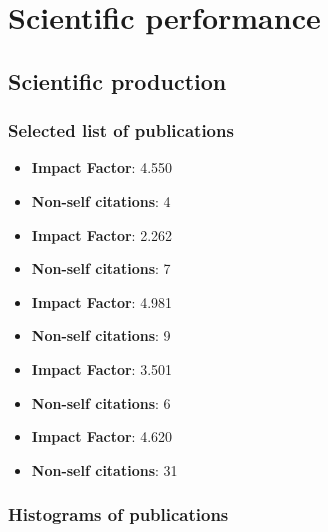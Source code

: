 \section{Scientific performance} \label{sec:sci-performance}

\subsection{Scientific production}

\subsubsection{Selected list of publications}

\autocite{Lamurias2015} 
\begin{itemize}
    \item \textbf{Impact Factor}: 4.550
    \item \textbf{Non-self citations}: 4
\end{itemize}

\autocite{Pesquita2014} 
\begin{itemize}
    \item \textbf{Impact Factor}: 2.262
    \item \textbf{Non-self citations}: 7
\end{itemize}

\autocite{Ferreira2013} 
\begin{itemize}
    \item \textbf{Impact Factor}: 4.981
    \item \textbf{Non-self citations}: 9
\end{itemize}

\autocite{Ferreira2012a} 
\begin{itemize}
    \item \textbf{Impact Factor}: 3.501
    \item \textbf{Non-self citations}: 6
\end{itemize}

\autocite{Ferreira2010} 
\begin{itemize}
    \item \textbf{Impact Factor}: 4.620
    \item \textbf{Non-self citations}: 31
\end{itemize}


\subsubsection{Histograms of publications}

